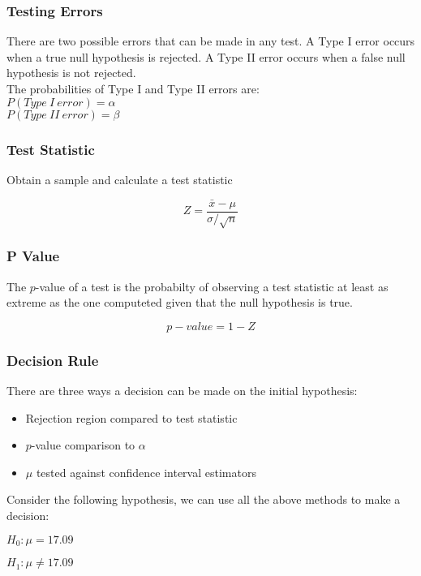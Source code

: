 \documentclass{article}
\begin{document}
\subsubsection{Testing Errors}
There are two possible errors that can be made in any test. A Type I error occurs when a true null hypothesis is rejected.
A Type II error occurs when a false null hypothesis is not rejected.\\

The probabilities of Type I and Type II errors are:\\

$P(Type\:I\:error) = \alpha$\\

$P(Type\:II\:error) = \beta$

\subsubsection{Test Statistic}
Obtain a sample and calculate a test statistic

$$
Z = \frac{\bar{x} - \mu}{\sigma / \sqrt{n}}
$$

\subsubsection{P Value}
The $p$-value of a test is the probabilty of observing a test statistic at least as extreme as the one computeted given that the null hypothesis is true.

$$
p-value = 1 - Z
$$


\subsubsection{Decision Rule}
There are three ways a decision can be made on the initial hypothesis:\\

\begin{itemize}
\item Rejection region compared to test statistic
\item $p$-value comparison to $\alpha$
\item $\mu$ tested against confidence interval estimators 
\end{itemize}

Consider the following hypothesis, we can use all the above methods to make a decision:

$H_0 : \mu = 17.09$

$H_1 : \mu \neq 17.09$\\
\end{document}

